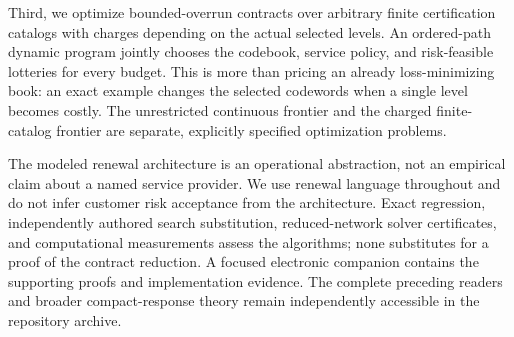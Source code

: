Third, we optimize bounded-overrun contracts over arbitrary finite certification catalogs with charges depending on the actual selected levels. An ordered-path dynamic program jointly chooses the codebook, service policy, and risk-feasible lotteries for every budget. This is more than pricing an already loss-minimizing book: an exact example changes the selected codewords when a single level becomes costly. The unrestricted continuous frontier and the charged finite-catalog frontier are separate, explicitly specified optimization problems.

The modeled renewal architecture is an operational abstraction, not an empirical claim about a named service provider. We use renewal language throughout and do not infer customer risk acceptance from the architecture. Exact regression, independently authored search substitution, reduced-network solver certificates, and computational measurements assess the algorithms; none substitutes for a proof of the contract reduction. A focused electronic companion contains the supporting proofs and implementation evidence. The complete preceding readers and broader compact-response theory remain independently accessible in the repository archive.
